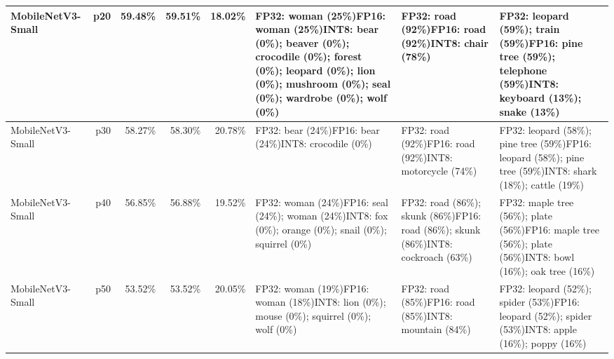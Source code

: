 \begin{longtable}{p{2.8cm} r r r r p{5.0cm} p{4.2cm} p{4.2cm}}
MobileNetV3-Small & p20 & 59.48\% & 59.51\% & 18.02\% & FP32: woman (25\%)\newline FP16: woman (25\%)\newline INT8: bear (0\%); beaver (0\%); crocodile (0\%); forest (0\%); leopard (0\%); lion (0\%); mushroom (0\%); seal (0\%); wardrobe (0\%); wolf (0\%) & FP32: road (92\%)\newline FP16: road (92\%)\newline INT8: chair (78\%) & FP32: leopard (59\%); train (59\%)\newline FP16: pine tree (59\%); telephone (59\%)\newline INT8: keyboard (13\%); snake (13\%) \\ \hline
MobileNetV3-Small & p30 & 58.27\% & 58.30\% & 20.78\% & FP32: bear (24\%)\newline FP16: bear (24\%)\newline INT8: crocodile (0\%) & FP32: road (92\%)\newline FP16: road (92\%)\newline INT8: motorcycle (74\%) & FP32: leopard (58\%); pine tree (59\%)\newline FP16: leopard (58\%); pine tree (59\%)\newline INT8: shark (18\%); cattle (19\%) \\ \hline
MobileNetV3-Small & p40 & 56.85\% & 56.88\% & 19.52\% & FP32: woman (24\%)\newline FP16: seal (24\%); woman (24\%)\newline INT8: fox (0\%); orange (0\%); snail (0\%); squirrel (0\%) & FP32: road (86\%); skunk (86\%)\newline FP16: road (86\%); skunk (86\%)\newline INT8: cockroach (63\%) & FP32: maple tree (56\%); plate (56\%)\newline FP16: maple tree (56\%); plate (56\%)\newline INT8: bowl (16\%); oak tree (16\%) \\ \hline
MobileNetV3-Small & p50 & 53.52\% & 53.52\% & 20.05\% & FP32: woman (19\%)\newline FP16: woman (18\%)\newline INT8: lion (0\%); mouse (0\%); squirrel (0\%); wolf (0\%) & FP32: road (85\%)\newline FP16: road (85\%)\newline INT8: mountain (84\%) & FP32: leopard (52\%); spider (53\%)\newline FP16: leopard (52\%); spider (53\%)\newline INT8: apple (16\%); poppy (16\%) \\ \hline

\end{longtable}
